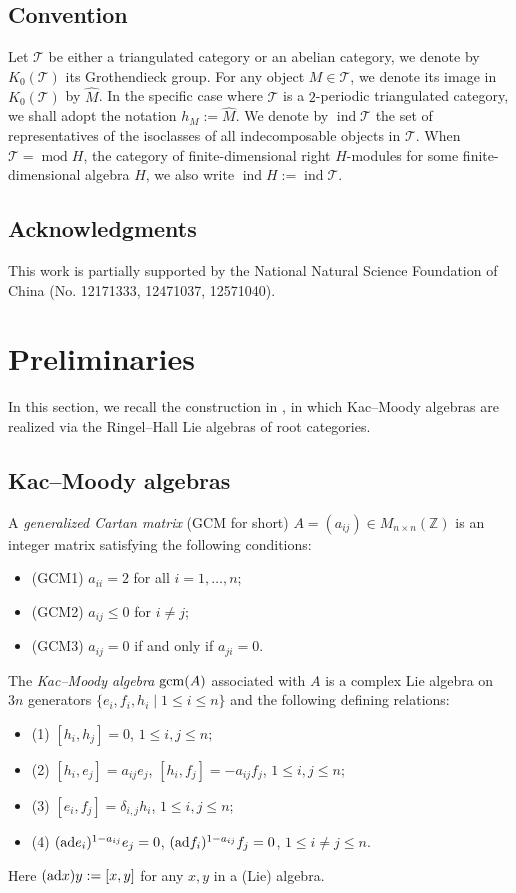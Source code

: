 \documentclass[12pt,reqno]{amsart}
\numberwithin{equation}{section}
\renewcommand{\mod}{\operatorname{mod}\nolimits}
\newcommand{\go}{{K_0}}
\begin{document}
	\subsection*{Convention}
	Let $\mathcal{T}$ be either a triangulated category or an abelian category, we denote by $\go(\mathcal{T})$ its Grothendieck group. For any object $M\in \mathcal{T}$, we denote its image in $\go(\mathcal{T})$ by $\hat{M}$. In the specific case where $\mathcal{T}$ is a $2$-periodic triangulated category, we shall adopt the notation $h_M := \hat{M}$. We denote by
	$\operatorname{ind}\mathcal{T}$ the set of representatives of the isoclasses of all indecomposable objects in $\mathcal{T}$. When $\mathcal{T}=\mod H$, the category of finite-dimensional right $H$-modules for some finite-dimensional algebra $H$, we also write $\operatorname{ind} H:=\operatorname{ind} \mathcal{T}$.
	
	\subsection*{Acknowledgments}
	This work is partially supported by the National Natural Science Foundation of China (No. 12171333, 12471037, 12571040). 
	
	\section{Preliminaries}\label{s:Preliminaries}
	In this section, we recall the construction in \cite{PX00-Tri-Cat-Kac}, in which Kac--Moody algebras are realized via the Ringel--Hall Lie algebras of root categories.
	
	\subsection{Kac--Moody algebras}
	A {\em generalized Cartan
		matrix} (GCM for short) $A =(a_{ij})\in {M}_{n\times n}(\mathbb{Z})$ is an integer matrix satisfying the following conditions:
	\begin{itemize}
		\item[](GCM1) $a_{ii}=2$ for all $i=1,\ldots,n$;
		\item[](GCM2) $a_{ij}\leq 0$ for $i\neq j$;
		\item[](GCM3) $a_{ij}=0$ if and only if $a_{ji}=0$.
	\end{itemize}
	The {\em Kac--Moody algebra} ${\rm gcm}(A)$ associated with $A$ is a complex Lie algebra on $3n$ generators $\{e_i,f_i,h_i \mid 1\leq i\leq n\}$ and  the following defining relations:
	\begin{itemize}
		\item[](1) $[h_i,h_j]=0$, $1\leq i,j\leq n$;
		\item[](2) $[h_i,e_j]=a_{ij}e_j$, $[h_i,f_j]=-a_{ij}f_j$, $1\leq i,j\leq n$;
		\item[](3) $[e_i,f_j]=\delta_{i,j}h_i$, $1\leq i,j\leq n$;
		\item[](4) $({\rm ad} e_i)^{1-a_{ij}}e_j=0$, $({\rm ad} f_i)^{1-a_{ij}}f_j=0$, $1\leq i\neq j\leq n$.
	\end{itemize}
	Here $({\rm ad}x)y:=[x,y]$ for any $x,y$ in a (Lie) algebra.
	
\end{document}
